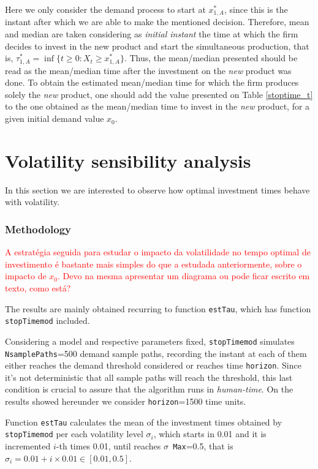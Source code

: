 Here we only consider the demand process to start at $x_{1,A}^*$, since this is the instant after which we are able to make the mentioned decision. Therefore, mean and median are taken considering as \textit{initial instant} the time at which the firm decides to invest in the new product and start the simultaneous production, that is, $\tau^*_{1,A}=\inf \{ t\geq 0: X_t \geq x^*_{1,A} \}$. Thus, the mean/median presented should be read as the mean/median time after the investment on the \textit{new} product was done. To obtain the estimated mean/median time for which the firm produces solely the \textit{new} product, one should add the value presented on Table \ref{stoptime_t} to the one obtained as the mean/median time to invest in the \textit{new} product, for a given initial demand value $x_0$.    




\section{Volatility sensibility analysis}

In this section we are interested to observe how optimal investment times behave with volatility.

\subsubsection{Methodology}
\textcolor{red}{A estratégia seguida para estudar o impacto da volatilidade no tempo optimal de investimento é bastante mais simples do que a estudada anteriormente, sobre o impacto de $x_0$. Devo na mesma apresentar um diagrama ou pode ficar escrito em texto, como está?}


The results are mainly obtained recurring to function \texttt{estTau}, which has function \texttt{stopTimemod} included.

Considering a model and respective parameters fixed, \texttt{stopTimemod} simulates \texttt{NsamplePaths}=500 demand sample paths, recording the instant at each of them either reaches the demand threshold considered or reaches time \texttt{horizon}. Since it's not deterministic that all sample paths will reach the threshold, this last condition is crucial to assure that the algorithm runs in \textit{human-time}. On the results showed hereunder we consider \texttt{horizon}=1500 time units.

Function \texttt{estTau} calculates the mean of the investment times obtained by \texttt{stopTimemod} per each volatility level $\sigma_i$, which starts in 0.01 and it is incremented $i$-th times 0.01, until reaches \texttt{$\sigma$ Max}=0.5, that is $\sigma_i=0.01+i \times 0.01 \in [0.01,0.5]$.

